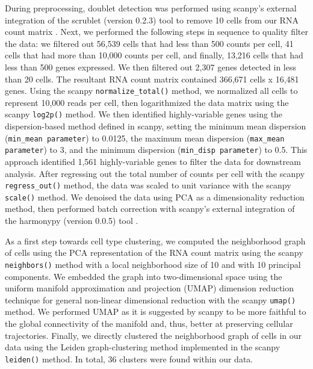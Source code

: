 During preprocessing, doublet detection was performed using scanpy's external integration of the scrublet (version 0.2.3) tool to remove 10 cells from our RNA count matrix \cite{wolock2019}. Next, we performed the following steps in sequence to quality filter the data: we filtered out 56,539 cells that had less than 500 counts per cell, 41 cells that had more than 10,000 counts per cell, and finally, 13,216 cells that had less than 500 genes expressed. We then filtered out 2,307 genes detected in less than 20 cells. The resultant RNA count matrix contained 366,671 cells x 16,481 genes. Using the scanpy \verb|normalize_total()| method, we normalized all cells to represent 10,000 reads per cell, then logarithmized the data matrix using the scanpy \verb|log2p()| method. We then identified highly-variable genes using the dispersion-based method defined in scanpy, setting the minimum mean dispersion (\verb|min_mean parameter|) to 0.0125, the maximum mean dispersion (\verb|max_mean parameter|) to 3, and the minimum dispersion (\verb|min_disp parameter|) to 0.5. This approach identified 1,561 highly-variable genes to filter the data for downstream analysis. After regressing out the total number of counts per cell with the scanpy \verb|regress_out()| method, the data was scaled to unit variance with the scanpy \verb|scale()| method. We denoised the data using PCA as a dimensionality reduction method, then performed batch correction with scanpy's external integration of the harmonypy (version 0.0.5) tool \cite{slowikowski2022}. 

As a first step towards cell type clustering, we computed the neighborhood graph of cells using the PCA representation of the RNA count matrix using the scanpy \verb|neighbors()| method with a local neighborhood size of 10 and with 10 principal components. We embedded the graph into two-dimensional space using the uniform manifold approximation and projection (UMAP) dimension reduction technique for general non-linear dimensional reduction with the scanpy \verb|umap()| method. We performed UMAP as it is suggested by scanpy to be more faithful to the global connectivity of the manifold and, thus, better at preserving cellular trajectories. Finally, we directly clustered the neighborhood graph of cells in our data using the Leiden graph-clustering method implemented in the scanpy \verb|leiden()| method. In total, 36 clusters were found within our data. 

